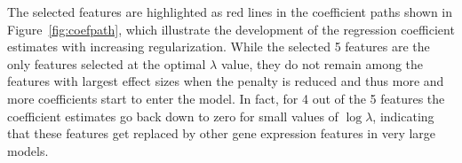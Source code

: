 \documentclass[]{jss}
\begin{document}
The selected features are highlighted as red lines in the coefficient paths shown in Figure~\ref{fig:coefpath}, which illustrate the development of the regression coefficient estimates with increasing regularization. While the selected 5 features are the only features selected at the optimal $\lambda$ value, they do not remain among the features with largest effect sizes when the penalty is reduced and thus more and more coefficients start to enter the model. In fact, for 4 out of the 5 features the coefficient estimates go back down to zero for small values of $\log\lambda$, indicating that these features get replaced by other gene expression features in very large models.

\begin{Schunk}
\end{Schunk}
\end{document}
